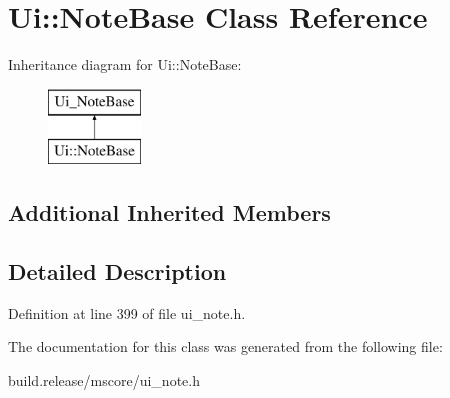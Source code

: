 \hypertarget{class_ui_1_1_note_base}{}\section{Ui\+:\+:Note\+Base Class Reference}
\label{class_ui_1_1_note_base}
Inheritance diagram for Ui\+:\+:Note\+Base\+:\begin{figure}[H]
\begin{center}
\leavevmode
\includegraphics[height=2.000000cm]{class_ui_1_1_note_base}
\end{center}
\end{figure}
\subsection*{Additional Inherited Members}


\subsection{Detailed Description}


Definition at line 399 of file ui\+\_\+note.\+h.



The documentation for this class was generated from the following file\+:\begin{DoxyCompactItemize}
\item 
build.\+release/mscore/ui\+\_\+note.\+h\end{DoxyCompactItemize}
